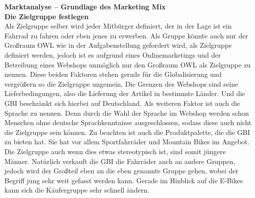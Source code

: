 \textbf{Marktanalyse – Grundlage des Marketing Mix}\\

\small{\textbf{Die Zielgruppe festlegen}}\\
Als Zielgruppe selber wird jeder Mitbürger definiert, der in der Lage ist ein Fahrrad zu fahren oder eben jenes zu erwerben. Als Gruppe könnte auch nur der Großraum OWL wie in der Aufgabenstellung gefordert wird, als Zielgruppe definiert werden, jedoch ist es aufgrund eines Onlinemarketings und der Betreibung eines Webshops unmöglich nur den Großraum OWL als Zielgruppe zu nennen. Diese beiden Faktoren stehen gerade für die Globalisierung und vergrößern so die Zielgruppe ungemein. Die Grenzen des Webshops sind seine Lieferbedingungen, also die Lieferung der Artikel in bestimmte Länder. Und die GBI beschränkt sich hierbei auf Deutschland. Als weiteren Faktor ist auch die Sprache zu nennen. Denn durch die Wahl der Sprache im Webshop werden schon Menschen ohne deutsche Sprachkenntnisse ausgeschlossen, sodass diese auch nicht die Zielgruppe sein können.
Zu beachten ist auch die Produktpalette, die die GBI zu bieten hat. Sie hat vor allem Sportfahrräder und Mountain Bikes im Angebot. Die Zielgruppe auch wenn dies etwas stereotypisch ist, sind somit jüngere Männer. Natürlich verkauft die GBI die Fahrräder auch an andere Gruppen, jedoch wird der Großteil eben an die eben genannte Gruppe gehen, wobei der Begriff jung sehr weit gefasst werden kann. Gerade im Hinblick auf die E-Bikes kann sich die Käufergruppe sehr schnell ändern.\\


